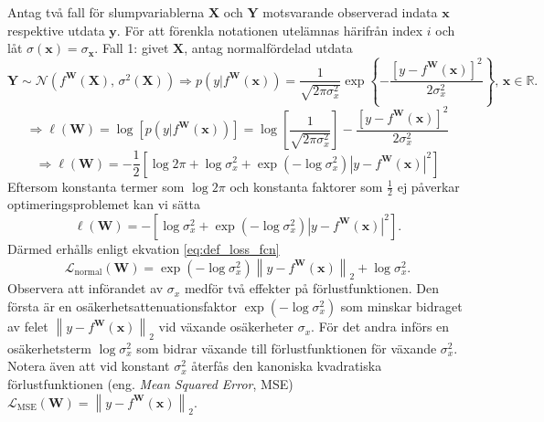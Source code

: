 Antag två fall för slumpvariablerna $\mathbf{X}$ och $\mathbf{Y}$ motsvarande observerad indata $\mathbf{x}$ respektive utdata $\mathbf{y}$. För att förenkla notationen utelämnas härifrån index $i$ och låt $\sigma(\mathbf{x}) = \sigma_\mathbf{x}$. Fall 1: givet $\mathbf{X}$, antag normalfördelad utdata
\begin{equation}
     \mathbf{Y} \sim \mathcal{N}\left(f^\mathbf{W}(\mathbf{X}),\, \sigma^2(\mathbf{X})  \right) \Rightarrow p\left(y|f^\mathbf{W}(\mathbf{x})\right) = \frac{1}{\sqrt{2\pi\sigma^2_x}} \exp \left\{-\frac{\left[y - f^\mathbf{W}(\mathbf{x})\right]^2}{2\sigma^2_x}\right\},\, \mathbf{x} \in \mathbb{R}.
\end{equation}
\begin{equation}
   \Rightarrow \ell(\mathbf{W}) = \log \left[p\left(y|f^\mathbf{W}(\mathbf{x})\right)\right] = \log \left[ \frac{1}{\sqrt{2\pi\sigma^2_x}}\right] - \frac{\left[y - f^\mathbf{W}(\mathbf{x})\right]^2}{2\sigma^2_x}
\end{equation}
\begin{equation}
    \Rightarrow \ell(\mathbf{W}) = -\frac{1}{2} \left[\log 2\pi + \log \sigma_x^2 + \exp{\left(-\log \sigma_x^2 \right)} \left|y - f^\mathbf{W}(\mathbf{x})\right|^2 \right]
\label{eq:const_arg}
\end{equation}
Eftersom konstanta termer som $\log 2\pi$ och konstanta faktorer som $\frac{1}{2}$ ej påverkar optimeringsproblemet kan vi sätta
\begin{equation}
    \ell(\mathbf{W}) = -\left[\log \sigma_x^2 + \exp{\left(-\log \sigma_x^2 \right)} \left|y - f^\mathbf{W}(\mathbf{x})\right|^2 \right].
\end{equation}
Därmed erhålls enligt ekvation \eqref{eq:def_loss_fcn}
\begin{equation}
    \mathcal{L}_{\mathrm{normal}}(\mathbf{W}) = \exp{\left(-\log \sigma_x^2 \right)} \left\|y - f^\mathbf{W}(\mathbf{x})\right\|_2 + \log \sigma_x^2.
    \label{eq:normal_loss_fcn}
\end{equation}
Observera att införandet av $\sigma_x$ medför två effekter på förlustfunktionen. Den första är en osäkerhetsattenuationsfaktor $\exp{\left(-\log \sigma_x^2 \right)}$ som minskar bidraget av felet $\left\|y - f^\mathbf{W}(\mathbf{x})\right\|_2$ vid växande osäkerheter $\sigma_x$. För det andra införs en osäkerhetsterm $\log \sigma_x^2$ som bidrar växande till förlustfunktionen för växande $\sigma_x^2$. Notera även att vid konstant $\sigma_x^2$ återfås den kanoniska kvadratiska förlustfunktionen (eng. \emph{Mean Squared Error}, MSE) $\mathcal{L}_\mathrm{MSE}(\mathbf{W}) = \left\|y - f^\mathbf{W}(\mathbf{x})\right\|_2$.

